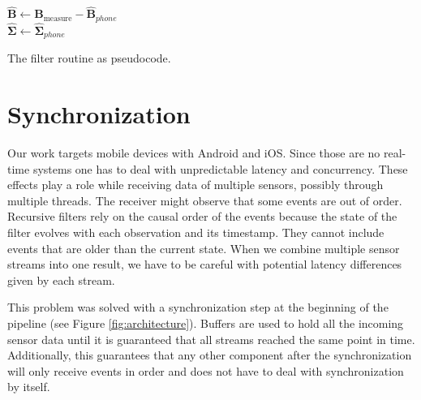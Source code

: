 \begin{algorithm}[h]
	$\bm{\hat{B}} \leftarrow \bm{B}_\text{measure} - \bm{\hat{B}}_{phone}$\\
    $\bm{\hat{\Sigma}} \leftarrow \bm{\hat{\Sigma}}_{phone}$\\
	\caption{The filter routine as pseudocode.}
	\label{alg:routine}
\end{algorithm}

\section{Synchronization}
\label{sec:impl_synchro}

Our work targets mobile devices with Android and iOS. Since those are no real-time systems one has to deal with unpredictable latency and concurrency. These effects play a role while receiving data of multiple sensors, possibly through multiple threads. The receiver might observe that some events are out of order. Recursive filters rely on the causal order of the events because the state of the filter evolves with each observation and its timestamp. They cannot include events that are older than the current state. When we combine multiple sensor streams into one result, we have to be careful with potential latency differences given by each stream.

This problem was solved with a synchronization step at the beginning of the pipeline (see Figure \ref{fig:architecture}). Buffers are used to hold all the incoming sensor data until it is guaranteed that all streams reached the same point in time. Additionally, this guarantees that any other component after the synchronization will only receive events in order and does not have to deal with synchronization by itself.

